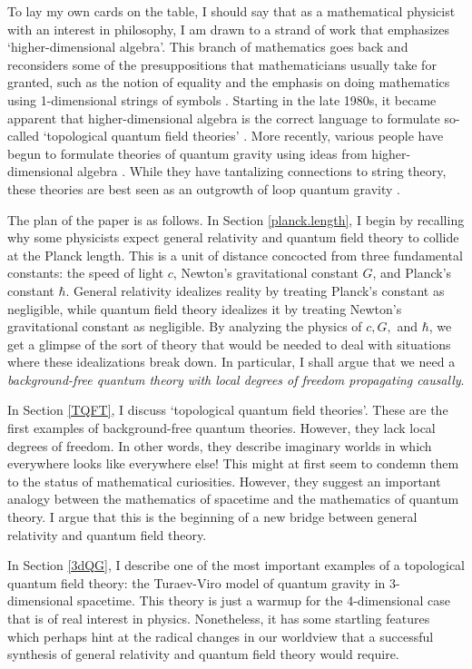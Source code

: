 To lay my own cards on the table, I should say that as a mathematical
physicist with an interest in philosophy, I am drawn to a strand of work
that emphasizes `higher-dimensional algebra'.  This branch of
mathematics goes back and reconsiders some of the presuppositions that
mathematicians usually take for granted, such as the notion of equality
\cite{BD2} and the emphasis on doing mathematics using 1-dimensional
strings of symbols \cite{Brown,Kauffman}.  Starting in the late 1980s,
it became apparent that higher-dimensional algebra is the correct
language to formulate so-called `topological quantum field theories'
\cite{BD,L,Turaev}.  More recently, various people have begun to formulate
theories of quantum gravity using ideas from higher-dimensional algebra
\cite{B3,BC,FK,MS,Reis}.  While they have tantalizing connections to string
theory, these theories are best seen as an outgrowth of loop quantum
gravity \cite{RR}.  

The plan of the paper is as follows.  In Section \ref{planck.length}, I
begin by recalling why some physicists expect general relativity and
quantum field theory to collide at the Planck length.  This is a unit of
distance concocted from three fundamental constants: the speed of light
$c$, Newton's gravitational constant $G$, and Planck's constant $\hbar$.
General relativity idealizes reality by treating Planck's constant as
negligible, while quantum field theory idealizes it by treating Newton's
gravitational constant as negligible.  By analyzing the physics of
$c,G,$ and $\hbar$, we get a glimpse of the sort of theory that would be
needed to deal with situations where these idealizations break down.  In
particular, I shall argue that we need a {\it background-free quantum
theory with local degrees of freedom propagating causally}.  

In Section \ref{TQFT}, I discuss `topological quantum field theories'. 
These are the first examples of background-free quantum  theories. 
However, they lack local degrees of freedom.  In other words, they
describe imaginary worlds in which everywhere looks like everywhere
else!   This might at first seem to condemn them to the status of
mathematical curiosities.  However, they suggest an important analogy 
between the mathematics of spacetime and the mathematics of quantum
theory.   I argue that this is the beginning of a new bridge between
general relativity and quantum field theory.  

In Section \ref{3dQG}, I describe one of the most important examples of a
topological quantum field theory: the Turaev-Viro model of
quantum gravity in 3-dimensional spacetime.   This theory is just a 
warmup for the 4-dimensional case that is of real interest in physics.  
Nonetheless, it has some startling features which perhaps hint at the 
radical changes in our worldview that a successful synthesis of 
general relativity and quantum field theory would require.

